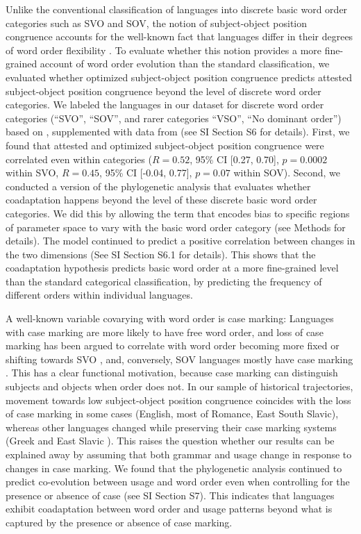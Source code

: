 \documentclass[11pt,a4paper]{article}
\begin{document}
Unlike the conventional classification of languages into discrete basic word order categories such as SVO and SOV, the notion of subject-object position congruence accounts for the well-known fact that languages differ in their degrees of word order flexibility \citep{steele1978word}.
To evaluate whether this notion provides a more fine-grained account of word order evolution than the standard classification, we evaluated whether optimized subject-object position congruence predicts attested subject-object position congruence beyond the level of discrete word order categories.
We labeled the languages in our dataset for discrete word order categories (``SVO'', ``SOV'', and rarer categories ``VSO'', ``No dominant order'') based on \citet{wals-81}, supplemented with data from \citet{gell-mann-origin-2011} (see SI Section S6 for details).
First, we found that attested and optimized subject-object position congruence were correlated even within categories ($R = 0.52$, 95\% CI [0.27, 0.70], $p = 0.0002$ within SVO, $R=0.45$, 95\% CI [-0.04, 0.77], $p=0.07$ within SOV).  %
Second, we conducted a version of the phylogenetic analysis that evaluates whether coadaptation happens beyond the level of these discrete basic word order categories.
We did this by allowing the term that encodes bias to specific regions of parameter space to vary with the basic word order category  (see Methods for details).
The model continued to predict a positive correlation between changes in the two dimensions (See SI Section S6.1 for details). %
This shows that the coadaptation hypothesis predicts basic word order at a more fine-grained level than the standard categorical classification, by predicting the frequency of different orders within individual languages.


A well-known variable covarying with word order is case marking: Languages with case marking are more likely to have free word order, and loss of case marking has been argued to correlate with word order becoming more fixed or shifting towards SVO \citep{vennemann1974explanation}, and, conversely, SOV languages mostly have case marking \citep[Universal 41]{greenberg-universals-1963}.
This has a clear functional motivation, because case marking can distinguish subjects and objects when order does not.
In our sample of historical trajectories, movement towards low subject-object position congruence coincides with the loss of case marking in some cases (English, most of Romance, East South Slavic), whereas other languages changed while preserving their case marking systems (Greek \citep{taylor1994change} and East Slavic \citep[p. 242--4]{matthews1960russian}).
This raises the question whether our results can be explained away by assuming that both grammar and usage change in response to changes in case marking.
We found that the phylogenetic analysis continued to predict co-evolution between usage and word order even when controlling for the presence or absence of case (see SI Section S7).
This indicates that languages exhibit coadaptation between word order and usage patterns beyond what is captured by the presence or absence of case marking.
\end{document}
